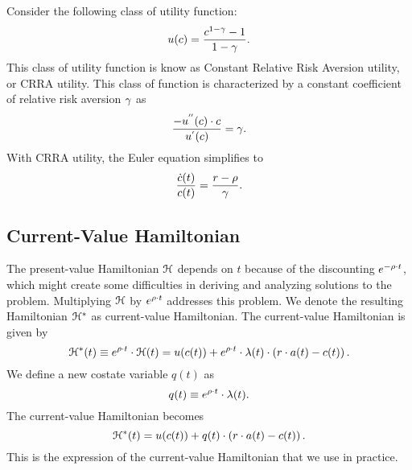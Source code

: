 \documentclass[letterpaper,12pt,leqno]{article}
\begin{document}
Consider the following class of utility function:
\begin{equation*}
u(c) =\frac{c^{1-\gamma }-1}{1-\gamma }.
\end{equation*}
This class of utility function is know as Constant Relative Risk Aversion utility, or CRRA utility. This class of function is characterized by a constant coefficient of relative risk aversion $\gamma$ as
\[\frac{-u^{''}(c) \cdot  c}{u^{'}(c)}=\gamma.\]
With CRRA utility, the Euler equation simplifies to
\begin{equation*}
\frac{\dot{c}(t)}{c(t)}=\frac{r-\rho}{\gamma}.
\end{equation*}

\subsection{Current-Value Hamiltonian}

The present-value Hamiltonian $\mathcal{H}$ depends on $t$ because of the discounting $e^{-\rho \cdot t}$, which might create some difficulties in deriving and analyzing solutions to the problem. Multiplying $\mathcal{H}$ by $e^{\rho \cdot t}$ addresses this problem. We denote the resulting Hamiltonian $\mathcal{H}^{*}$ as current-value Hamiltonian. The current-value Hamiltonian is given by
\begin{equation*}
\mathcal{H}^{*}(t)\equiv e^{\rho \cdot t}\cdot  \mathcal{H}(t)=u(c(t)) +e^{\rho \cdot t} \cdot \lambda(t) \cdot \left( r\cdot a(t)-c(t) \right).
\end{equation*}
We define a new costate variable $q(t)$ as
\begin{equation*}
q(t)\equiv  e^{\rho \cdot t} \cdot \lambda(t).
\end{equation*}
The current-value Hamiltonian becomes
\begin{equation*}
\mathcal{H}^{*}(t)= u(c(t)) +q(t) \cdot \left( r\cdot a(t)-c(t) \right).
\end{equation*}
This is the expression of the current-value Hamiltonian that we use in practice.
\end{document}
